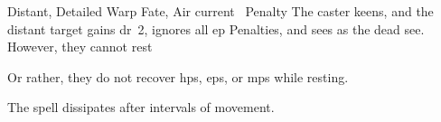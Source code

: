   {Distant, Detailed}%
  {Warp}%
  {Fate, Air}%
  {current ~Penalty}%
  {The caster keens, and the distant target gains \gls{dr}~2, ignores all \gls{ep} Penalties, and sees as the dead see.
  However, they cannot rest}%
  {Or rather, they do not recover \glspl{hp}, \glspl{ep}, or \glspl{mp} while resting.

  The spell dissipates after  \glspl{interval} of movement.}

